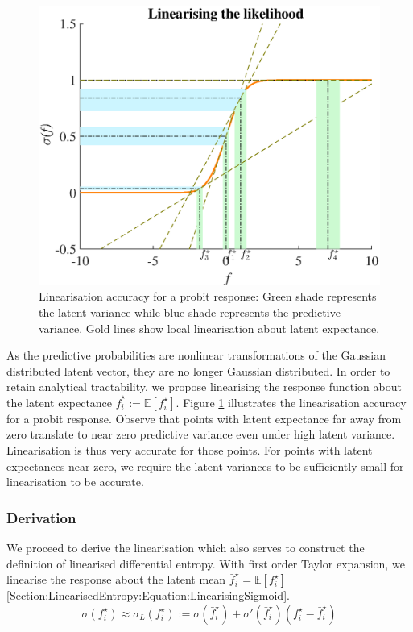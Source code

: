 \documentclass{article}
\begin{document}
		\begin{figure}[!htbp]
			\centering
				\includegraphics[width = \linewidth]{Figures/linearisation.eps}
			\caption{Linearisation accuracy for a probit response: Green shade represents the latent variance while blue shade represents the predictive variance. Gold lines show local linearisation about latent expectance.}
			\label{Figure:Linearisation}
		\end{figure}
			
		As the predictive probabilities are nonlinear transformations of the Gaussian distributed latent vector, they are no longer Gaussian distributed. In order to retain analytical tractability, we propose linearising the response function about the latent expectance $\bar{f}^{\star}_{i} := \mathbb{E}[f^{\star}_{i}]$. Figure \ref{Figure:Linearisation} illustrates the linearisation accuracy for a probit response. Observe that points with latent expectance far away from zero translate to near zero predictive variance even under high latent variance. Linearisation is thus very accurate for those points. For points with latent expectances near zero, we require the latent variances to be sufficiently small for linearisation to be accurate.
		
		\subsubsection{Derivation}
		
			We proceed to derive the linearisation which also serves to construct the definition of linearised differential entropy. With first order Taylor expansion, we linearise the response about the latent mean $\bar{f}^{\star}_{i} = \mathbb{E}[f^{\star}_{i}]$ \eqref{Section:LinearisedEntropy:Equation:LinearisingSigmoid}. \begin{equation}
				\sigma(f^{\star}_{i}) \approx \sigma_{L}(f^{\star}_{i}) := \sigma(\bar{f}^{\star}_{i}) + \sigma'(\bar{f}^{\star}_{i}) (f^{\star}_{i} - \bar{f}^{\star}_{i})
			\label{Section:LinearisedEntropy:Equation:LinearisingSigmoid}
			\end{equation}
			
\end{document}
